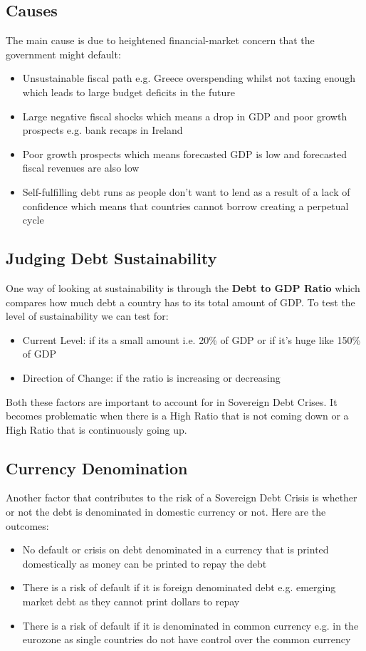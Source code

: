 \documentclass[12pt, letterpaper]{article}
\begin{document}
\subsection{Causes}
The main cause is due to heightened financial-market concern that the government might default:
\begin{itemize}
	\item Unsustainable fiscal path e.g. Greece overspending whilst not taxing enough which leads to large budget deficits in the future
	\item Large negative fiscal shocks which means a drop in GDP and poor growth prospects e.g. bank recaps in Ireland
	\item Poor growth prospects which means forecasted GDP is low and forecasted fiscal revenues are also low
	\item Self-fulfilling debt runs as people don't want to lend as a result of a lack of confidence which means that countries cannot borrow creating a perpetual cycle
\end{itemize}

\subsection{Judging Debt Sustainability}
One way of looking at sustainability is through the \textbf{Debt to GDP Ratio} which compares how much debt a country has to its total amount of GDP. To test the level of sustainability we can test for:
\begin{itemize}
	\item Current Level: if its a small amount i.e. 20\% of GDP or if it's huge like 150\% of GDP
	\item Direction of Change: if the ratio is increasing or decreasing
\end{itemize}
Both these factors are important to account for in Sovereign Debt Crises. It becomes problematic when there is a High Ratio that is not coming down or a High Ratio that is continuously going up.

\subsection{Currency Denomination}
Another factor that contributes to the risk of a Sovereign Debt Crisis is whether or not the debt is denominated in domestic currency or not. Here are the outcomes:
\begin{itemize}
	\item No default or crisis on debt denominated in a currency that is printed domestically as money can be printed to repay the debt
	\item There is a risk of default if it is foreign denominated debt e.g. emerging market debt as they cannot print dollars to repay
	\item There is a risk of default if it is denominated in common currency e.g. in the eurozone as single countries do not have control over the common currency
\end{itemize}
\end{document}
